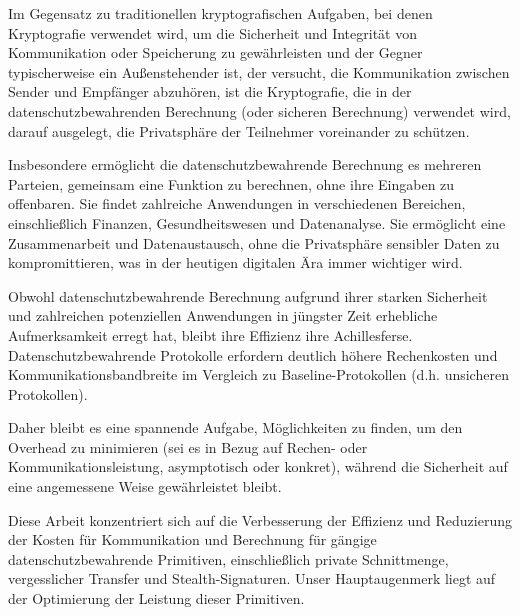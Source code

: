 Im Gegensatz zu traditionellen kryptografischen Aufgaben, bei denen Kryptografie verwendet wird, um die Sicherheit und Integrit\"at von Kommunikation oder Speicherung zu gew\"ahrleisten und der Gegner typischerweise ein Außenstehender ist, der versucht, die Kommunikation zwischen Sender und Empf\"anger abzuhören, ist die Kryptografie, die in der datenschutzbewahrenden Berechnung (oder sicheren Berechnung) verwendet wird, darauf ausgelegt, die Privatsph\"are der Teilnehmer voreinander zu schützen.

Insbesondere erm\"oglicht die datenschutzbewahrende Berechnung es mehreren Parteien, gemeinsam eine Funktion zu berechnen, ohne ihre Eingaben zu offenbaren. Sie findet zahlreiche Anwendungen in verschiedenen Bereichen, einschließlich Finanzen, Gesundheitswesen und Datenanalyse. Sie erm\"oglicht eine Zusammenarbeit und Datenaustausch, ohne die Privatsph\"are sensibler Daten zu kompromittieren, was in der heutigen digitalen \"Ara immer wichtiger wird.

Obwohl datenschutzbewahrende Berechnung aufgrund ihrer starken Sicherheit und zahlreichen potenziellen Anwendungen in jüngster Zeit erhebliche Aufmerksamkeit erregt hat, bleibt ihre Effizienz ihre Achillesferse. Datenschutzbewahrende Protokolle erfordern deutlich h\"ohere Rechenkosten und Kommunikationsbandbreite im Vergleich zu Baseline-Protokollen (d.h. unsicheren Protokollen).

\begin{sloppypar}
Daher bleibt es eine spannende Aufgabe, M\"oglichkeiten zu finden, um den Overhead zu minimieren (sei es in Bezug auf Rechen- oder Kommunikationsleistung, asymptotisch oder konkret), w\"ahrend die Sicherheit auf eine angemessene Weise gew\"ahrleistet bleibt.
\end{sloppypar}

Diese Arbeit konzentriert sich auf die Verbesserung der Effizienz und Reduzierung der Kosten für Kommunikation und Berechnung für g\"angige datenschutzbewahrende Primitiven, einschließlich private Schnittmenge, vergesslicher Transfer und Stealth-Signaturen. Unser Hauptaugenmerk liegt auf der Optimierung der Leistung dieser Primitiven.